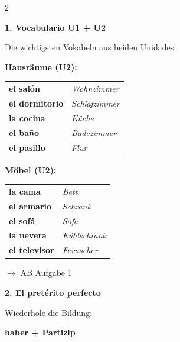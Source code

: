 \documentclass[11pt, a4paper]{article}
\newcommand{\seriftext}[1]{{\fontfamily{ppl}\selectfont #1}}
\newcommand{\es}[1]{\seriftext{\textbf{#1}}}
\newcommand{\de}[1]{\textit{\textcolor{akzent}{#1}}}
\newcommand{\abmark}[1]{{\footnotesize\textcolor{akzent}{$\rightarrow$ AB #1}}}
\newcommand{\abschnitt}[2]{\noindent\textbf{\large #1. #2}}
\begin{document}
\begin{multicols}{2}

\abschnitt{1}{Vocabulario U1 + U2}

\vspace{4pt}

Die wichtigsten Vokabeln aus beiden Unidades:

\vspace{3pt}

{\small\textbf{Hausräume (U2):}}

{\footnotesize
\begin{tabular}{@{}ll@{}}
\es{el salón} & \de{Wohnzimmer} \\
\es{el dormitorio} & \de{Schlafzimmer} \\
\es{la cocina} & \de{Küche} \\
\es{el baño} & \de{Badezimmer} \\
\es{el pasillo} & \de{Flur} \\
\end{tabular}}

\vspace{3pt}

{\small\textbf{Möbel (U2):}}

{\footnotesize
\begin{tabular}{@{}ll@{}}
\es{la cama} & \de{Bett} \\
\es{el armario} & \de{Schrank} \\
\es{el sofá} & \de{Sofa} \\
\es{la nevera} & \de{Kühlschrank} \\
\es{el televisor} & \de{Fernseher} \\
\end{tabular}}

\abmark{Aufgabe 1}

\vspace{8pt}

\abschnitt{2}{El pretérito perfecto}

\vspace{4pt}

Wiederhole die Bildung:

\begin{grammatikbox}
\textbf{haber + Partizip}


\end{grammatikbox}
\end{multicols}
\end{document}

